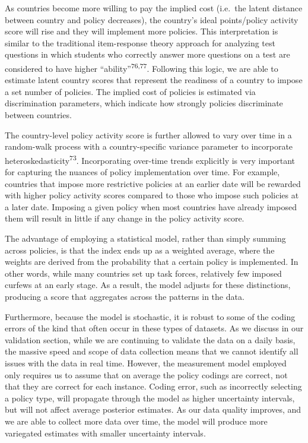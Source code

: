 \documentclass[]{article}
\begin{document}
As countries become more willing to pay the implied cost (i.e.~the latent distance between country and policy decreases), the country's ideal points/policy activity score will rise and they will implement more policies. This interpretation is similar to the traditional item-response theory approach for analyzing test questions in which students who correctly answer more questions on a test are considered to have higher ``ability''\textsuperscript{76,77}. Following this logic, we are able to estimate latent country scores that represent the readiness of a country to impose a set number of policies. The implied cost of policies is estimated via discrimination parameters, which indicate how strongly policies discriminate between countries.

The country-level policy activity score is further allowed to vary over time in a random-walk process with a country-specific variance parameter to incorporate heteroskedasticity\textsuperscript{73}. Incorporating over-time trends explicitly is very important for capturing the nuances of policy implementation over time. For example, countries that impose more restrictive policies at an earlier date will be rewarded with higher policy activity scores compared to those who impose such policies at a later date. Imposing a given policy when most countries have already imposed them will result in little if any change in the policy activity score.

The advantage of employing a statistical model, rather than simply summing across policies, is that the index ends up as a weighted average, where the weights are derived from the probability that a certain policy is implemented. In other words, while many countries set up task forces, relatively few imposed curfews at an early stage. As a result, the model adjusts for these distinctions, producing a score that aggregates across the patterns in the data.

Furthermore, because the model is stochastic, it is robust to some of the coding errors of the kind that often occur in these types of datasets. As we discuss in our validation section, while we are continuing to validate the data on a daily basis, the massive speed and scope of data collection means that we cannot identify all issues with the data in real time. However, the measurement model employed only requires us to assume that on average the policy codings are correct, not that they are correct for each instance. Coding error, such as incorrectly selecting a policy type, will propagate through the model as higher uncertainty intervals, but will not affect average posterior estimates. As our data quality improves, and we are able to collect more data over time, the model will produce more variegated estimates with smaller uncertainty intervals.
\end{document}
